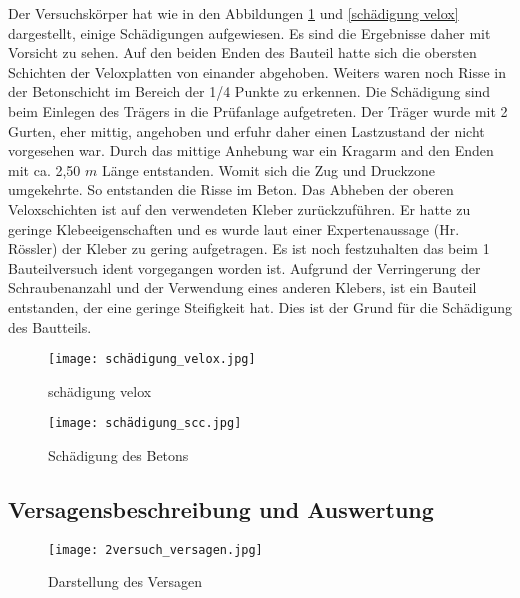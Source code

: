 \documentclass[12 pt,a4 paper ]{scrreprt}
\begin{document}
Der Versuchskörper hat wie in den Abbildungen \ref{schädigung scc} und \ref{schädigung velox} dargestellt, einige Schädigungen aufgewiesen. Es sind die Ergebnisse daher mit Vorsicht zu sehen. Auf den beiden Enden des Bauteil hatte sich die obersten Schichten der Veloxplatten von einander abgehoben. Weiters waren noch Risse in der Betonschicht im Bereich der 1/4 Punkte zu erkennen.
Die Schädigung sind beim Einlegen des Trägers in die Prüfanlage aufgetreten. Der Träger wurde mit 2 Gurten, eher mittig, angehoben und erfuhr daher einen Lastzustand der nicht vorgesehen war. Durch das mittige Anhebung war ein Kragarm and den Enden  mit ca. 2,50 $m$ Länge entstanden. Womit sich die Zug und Druckzone umgekehrte. So entstanden die Risse im Beton. Das Abheben der oberen Veloxschichten ist auf den verwendeten Kleber zurückzuführen. Er hatte zu geringe Klebeeigenschaften und es wurde laut einer Expertenaussage (Hr. Rössler)  der Kleber zu gering aufgetragen.
Es ist noch festzuhalten das beim 1 Bauteilversuch ident vorgegangen worden ist. Aufgrund der Verringerung der Schraubenanzahl und der Verwendung eines anderen Klebers, ist ein Bauteil entstanden, der eine geringe Steifigkeit hat. Dies ist der Grund für die Schädigung des Bautteils.




\begin{figure}[h]
\begin{minipage}[hbt]{7cm}	
	\texttt{[image: schädigung\_velox.jpg]}
	\caption{schädigung velox}
	\label{schädigung velox}
\end{minipage}
\hfill
\begin{minipage}[hbt]{7cm}
	\texttt{[image: schädigung\_scc.jpg]}
	\caption{Schädigung des Betons}
	\label{schädigung scc}
\end{minipage}
\end{figure}


\subsection{Versagensbeschreibung und Auswertung}



\begin{figure}
\begin{center}
\texttt{[image: 2versuch\_versagen.jpg]}
\caption{Darstellung des Versagen}
\label{2versuch versagen}
\end{center}
\end{figure}
\end{document}

